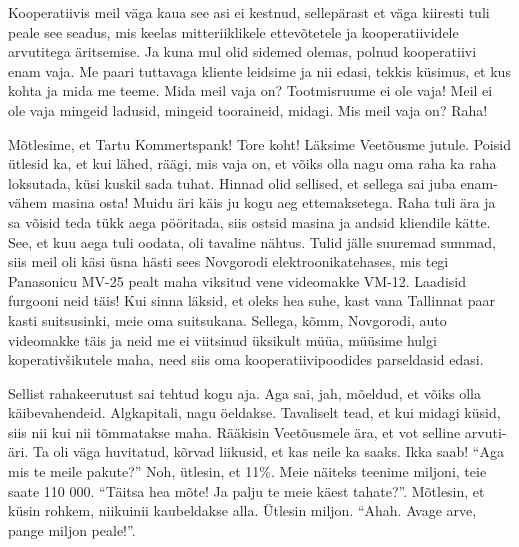 
Kooperatiivis meil väga kaua see asi ei kestnud,  sellepärast et väga kiiresti 
tuli peale see seadus, mis keelas mitteriiklikele ettevõtetele ja 
kooperatiividele arvutitega äritsemise. Ja kuna mul olid sidemed olemas, polnud 
kooperatiivi enam vaja. Me paari tuttavaga kliente leidsime ja nii edasi, 
tekkis küsimus, et kus kohta ja mida me teeme. Mida meil vaja on? Tootmisruume 
ei ole vaja! Meil ei ole vaja mingeid ladusid, mingeid tooraineid, midagi. Mis 
meil vaja on? Raha!

Mõtlesime, et Tartu Kommertspank! Tore koht! Läksime 
Veetõusme jutule. Poisid ütlesid ka, 
et kui lähed, räägi, mis vaja on, et võiks olla nagu oma raha ka raha 
loksutada, küsi kuskil sada tuhat. Hinnad olid sellised, et sellega sai juba 
enam-vähem masina osta! Muidu äri käis ju kogu aeg ettemaksetega. Raha tuli ära 
ja sa võisid teda tükk aega pööritada, siis ostsid  masina ja andsid kliendile 
kätte. See, et kuu aega tuli oodata, oli tavaline nähtus. Tulid jälle suuremad 
summad, siis meil oli käsi üsna hästi sees Novgorodi elektroonikatehases, mis 
tegi  Panasonicu MV-25 pealt maha viksitud vene videomakke VM-12. Laadisid 
furgooni neid täis! Kui sinna läksid, et oleks hea suhe, kast vana Tallinnat 
paar kasti suitsusinki, meie oma suitsukana. Sellega, kõmm, Novgorodi, auto 
videomakke täis ja neid me ei viitsinud üksikult müüa, müüsime hulgi 
koperativšikutele maha, need siis oma kooperatiivipoodides parseldasid edasi. 

Sellist rahakeerutust sai tehtud kogu aja. Aga sai, jah, mõeldud, et võiks olla 
käibevahendeid. Algkapitali, nagu öeldakse. Tavaliselt tead, et kui  midagi 
küsid, siis nii kui nii tõmmatakse maha. Rääkisin 
Veetõusmele ära, et vot selline arvuti-äri. Ta oli 
väga huvitatud, kõrvad liikusid, et kas neile ka saaks. Ikka saab! \enquote{Aga 
mis te meile pakute?} Noh, ütlesin, et 11\%. Meie näiteks teenime miljoni, teie 
saate 110 000. \enquote{Täitsa hea mõte! Ja palju te meie käest tahate?}. 
Mõtlesin, et küsin rohkem, niikuinii kaubeldakse alla. Ütlesin miljon. 
\enquote{Ahah. Avage arve, pange miljon peale!}.

